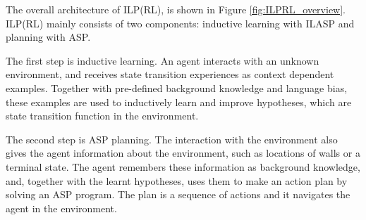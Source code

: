 

The overall architecture of ILP(RL), is shown in Figure \ref{fig:ILPRL_overview}. 
ILP(RL) mainly consists of two components: inductive learning with ILASP and planning with ASP. 

The first step is inductive learning. An agent interacts with an unknown environment, 
and receives state transition experiences as context dependent examples. 
Together with pre-defined background knowledge and language bias, these examples are used to inductively learn and improve hypotheses, which are state transition function in the environment.

The second step is ASP planning. The interaction with the environment also gives the agent information about the environment, such as locations of walls or a terminal state. 
The agent remembers these information as background knowledge, and, 
together with the learnt hypotheses, uses them to make an action plan by solving an ASP program.
The plan is a sequence of actions and it navigates the agent in the environment.

